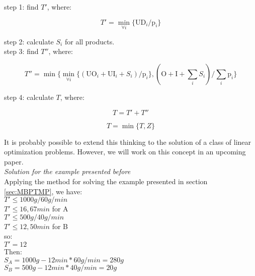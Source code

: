 \documentclass[preprint,12pt,authoryear]{elsarticle}
\begin{document}
step 1: find $T'$, where:

\begin{equation}
T' = \min_{\forall i} \{\textrm{UD}_i / \textrm{p}_i\}
\end{equation}

step 2: calculate $S_i$ for all products. \\

step 3: find $T''$, where:

\begin{equation}
T'' = \min \{\min_{\forall i} \{(\textrm{UO}_i + \textrm{UI}_i + S_i) / \textrm{p}_i\},(\textrm{O} + \textrm{I} + \sum_i {S_i}) / \sum_i {\textrm{p}_i}\}
\end{equation}

step 4: calculate $T$, where: 

\begin{equation}
T = T' + T''
\end{equation}

\begin{equation}
T = \min \{T , Z\}
\end{equation}

It is probably possible to extend this thinking to the solution of a class of linear optimization problems. However, we will work on this concept in an upcoming paper. \\

\emph{Solution for the example presented before} \\

Applying the method for solving the example presented in section \ref{sec:MBPTMP}, we have: \\

$T' \leq 1000g / 60g/min$ \\

$T' \leq 16,67 min$ \quad for A \\

$T' \leq 500g / 40g/min$ \\

$T' \leq 12,50 min$ \quad for B \\

so: \\

$T' = 12$ \\

Then:\\

$S_A = 1000g - 12min * 60g/min = 280g$ \\

$S_B = 500g - 12min * 40g/min = 20g$ \\
\end{document}
